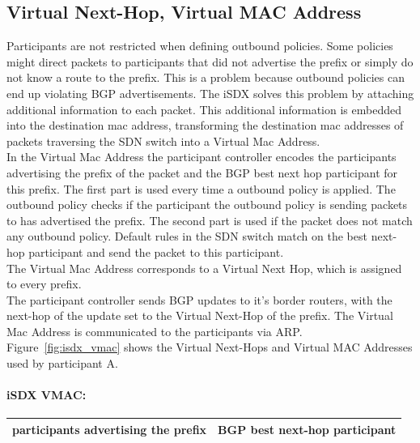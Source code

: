 \subsection{\label{chapter2:iSDX:virtual next-hop, virtual mac address}Virtual Next-Hop, Virtual MAC Address}


Participants are not restricted when defining outbound policies. Some policies might direct packets to participants that did not advertise the prefix or simply do not know a route to the prefix. This is a problem because outbound policies can end up violating BGP advertisements. The iSDX solves this problem by attaching additional information to each packet. This additional information is embedded into the destination mac address, transforming the destination mac addresses of packets traversing the SDN switch into a Virtual Mac Address. \\ 
In the Virtual Mac Address the participant controller encodes the participants advertising the prefix of the packet and the BGP best next hop participant for this prefix. The first part is used every time a outbound policy is applied. The outbound policy checks if the participant the outbound policy is sending packets to has advertised the prefix. The second part is used if the packet does not match any outbound policy. Default rules in the SDN switch match on the best next-hop participant and send the packet to this participant. \\
The Virtual Mac Address corresponds to a Virtual Next Hop, which is assigned to every prefix. \\ The participant controller sends BGP updates to it's border routers, with the next-hop of the update set to the Virtual Next-Hop of the prefix. The Virtual Mac Address is communicated to the participants via ARP. \\
Figure~\ref{fig:isdx_vmac} shows the Virtual Next-Hops and Virtual MAC Addresses used by participant A.

\paragraph{\label{chapter2:iSDX:virtual next-hop :inbound policies}iSDX VMAC:}

\begin{tabular}{|r|l|}
  \hline 
  participants advertising the prefix & BGP best next-hop participant \\
  \hline
\end{tabular}

